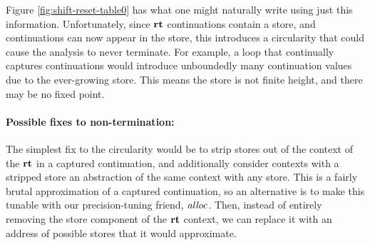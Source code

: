 Figure \ref{fig:shift-reset-table0} has what one might naturally write using just this information.
%
Unfortunately, since $\mathbf{rt}$ continuations contain a store, and continuations can now appear in the store, this introduces a circularity that could cause the analysis to never terminate.
%
For example, a loop that continually captures continuations would introduce unboundedly many continuation values due to the ever-growing store.
%
This means the store is not finite height, and there may be no fixed point.

\paragraph{Possible fixes to non-termination:} The simplest fix to the circularity would be to strip stores out of the context of the $\mathbf{rt}$ in a captured continuation, and additionally consider contexts with a stripped store an abstraction of the same context with any store.
%
This is a fairly brutal approximation of a captured continuation, so an alternative is to make this tunable with our precision-tuning friend, $\mathit{alloc}$.
%
Then, instead of entirely removing the store component of the $\mathbf{rt}$ context, we can replace it with an address of possible stores that it would approximate.

